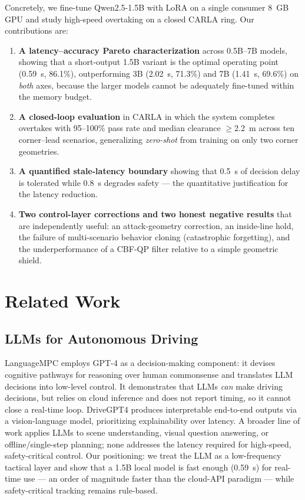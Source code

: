 \documentclass[conference]{IEEEtran}
\begin{document}
Concretely, we fine-tune Qwen2.5-1.5B with LoRA on a single consumer 8~GB GPU
and study high-speed overtaking on a closed CARLA ring. Our contributions are:
\begin{enumerate}
\item \textbf{A latency--accuracy Pareto characterization} across 0.5B--7B
models, showing that a short-output 1.5B variant is the optimal operating point
(0.59~s, 86.1\%), outperforming 3B (2.02~s, 71.3\%) and 7B (1.41~s, 69.6\%) on
\emph{both} axes, because the larger models cannot be adequately fine-tuned
within the memory budget.
\item \textbf{A closed-loop evaluation} in CARLA in which the system completes
overtakes with 95--100\% pass rate and median clearance $\geq$2.2~m across ten
corner--lead scenarios, generalizing \emph{zero-shot} from training on only two
corner geometries.
\item \textbf{A quantified stale-latency boundary} showing that 0.5~s of
decision delay is tolerated while 0.8~s degrades safety --- the quantitative
justification for the latency reduction.
\item \textbf{Two control-layer corrections and two honest negative results}
that are independently useful: an attack-geometry correction, an inside-line
hold, the failure of multi-scenario behavior cloning (catastrophic forgetting),
and the underperformance of a CBF-QP filter relative to a simple geometric
shield.
\end{enumerate}

\section{Related Work}
\subsection{LLMs for Autonomous Driving}
LanguageMPC \cite{sha2023languagempc} employs GPT-4 as a decision-making
component: it devises cognitive pathways for reasoning over human commonsense
and translates LLM decisions into low-level control. It demonstrates that LLMs
\emph{can} make driving decisions, but relies on cloud inference and does not
report timing, so it cannot close a real-time loop. DriveGPT4
\cite{xu2023drivegpt4} produces interpretable end-to-end outputs via a
vision-language model, prioritizing explainability over latency. A broader line
of work applies LLMs to scene understanding, visual question answering, or
offline/single-step planning; none addresses the latency required for
high-speed, safety-critical control. Our positioning: we treat the LLM as a
low-frequency tactical layer and show that a 1.5B local model is fast enough
(0.59~s) for real-time use --- an order of magnitude faster than the cloud-API
paradigm --- while safety-critical tracking remains rule-based.
\end{document}
